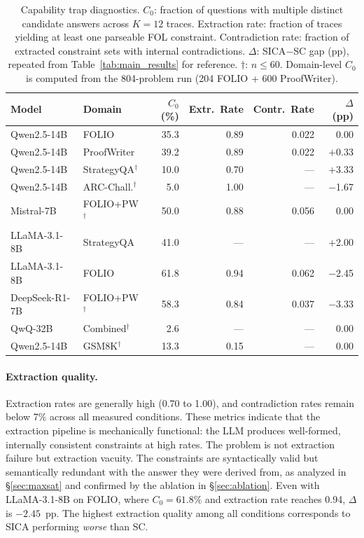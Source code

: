 \begin{table}[t]
\centering
\small
\caption{Capability trap diagnostics. $C_0$: fraction of questions with multiple distinct candidate answers across $K=12$ traces. Extraction rate: fraction of traces yielding at least one parseable FOL constraint. Contradiction rate: fraction of extracted constraint sets with internal contradictions. $\Delta$: SICA$-$SC gap (pp), repeated from Table~\ref{tab:main_results} for reference. $\dagger$: $n \leq 60$. Domain-level $C_0$ is computed from the 804-problem run (204 FOLIO + 600 ProofWriter).}
\label{tab:capability_trap}
\begin{tabular}{@{}llrrrr@{}}
\toprule
Model & Domain & $C_0$ (\%) & Extr.\ Rate & Contr.\ Rate & $\Delta$ (pp) \\
\midrule
Qwen2.5-14B & FOLIO & 35.3 & 0.89 & 0.022 & 0.00 \\
Qwen2.5-14B & ProofWriter & 39.2 & 0.89 & 0.022 & $+$0.33 \\
Qwen2.5-14B & StrategyQA$^\dagger$ & 10.0 & 0.70 & --- & $+$3.33 \\
Qwen2.5-14B & ARC-Chall.$^\dagger$ & 5.0 & 1.00 & --- & $-$1.67 \\
Mistral-7B & FOLIO+PW$^\dagger$ & 50.0 & 0.88 & 0.056 & 0.00 \\
LLaMA-3.1-8B & StrategyQA & 41.0 & --- & --- & $+$2.00 \\
LLaMA-3.1-8B & FOLIO & 61.8 & 0.94 & 0.062 & $-$2.45 \\
DeepSeek-R1-7B & FOLIO+PW$^\dagger$ & 58.3 & 0.84 & 0.037 & $-$3.33 \\
QwQ-32B & Combined$^\dagger$ & 2.6 & --- & --- & 0.00 \\
Qwen2.5-14B & GSM8K$^\dagger$ & 13.3 & 0.15 & --- & 0.00 \\
\bottomrule
\end{tabular}
\end{table}

\paragraph{Extraction quality.} Extraction rates are generally high (0.70 to 1.00), and contradiction rates remain below 7\% across all measured conditions. These metrics indicate that the extraction pipeline is mechanically functional: the LLM produces well-formed, internally consistent constraints at high rates. The problem is not extraction failure but extraction vacuity. The constraints are syntactically valid but semantically redundant with the answer they were derived from, as analyzed in \S\ref{sec:maxsat} and confirmed by the ablation in \S\ref{sec:ablation}. Even with LLaMA-3.1-8B on FOLIO, where $C_0 = 61.8\%$ and extraction rate reaches 0.94, $\Delta$ is $-2.45$~pp. The highest extraction quality among all conditions corresponds to SICA performing \emph{worse} than SC.


